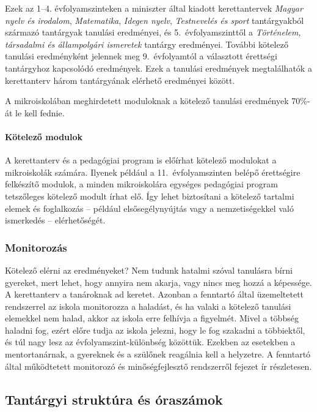 Ezek az 1--4. évfolyamszinteken a miniszter által kiadott kerettantervek \emph{Magyar nyelv és irodalom}, \emph{Matematika}, \emph{Idegen nyelv}, \emph{Testnevelés és sport} tantárgyakból származó tantárgyak tanulási eredményei, és 5.~évfolyamszinttől a \emph{Történelem, társadalmi és állampolgári ismeretek} tantárgy eredményei. További kötelező tanulási eredményként jelennek meg 9.~évfolyamtól a választott érettségi tantárgyhoz kapcsolódó eredmények. Ezek a tanulási eredmények megtalálhatók a kerettanterv három tantárgyának elérhető eredményei között.

A mikroiskolában meghirdetett moduloknak a kötelező tanulási eredmények 70\%-át le kell fednie.

\paragraph{Kötelező modulok}
A kerettanterv és a pedagógiai program is előírhat kötelező modulokat a mikroiskolák számára. Ilyenek például a 11.~évfolyamszinten belépő érettségire felkészítő modulok, a minden mikroiskolára egységes pedagógiai program tetszőleges kötelező modult írhat elő. Így lehet biztosítani a kötelező tartalmi elemek és foglalkozás -- például elsősegélynyújtás vagy a nemzetiségekkel való ismerkedés -- elérhetőségét.

\subsubsection{Monitorozás}

Kötelező elérni az eredményeket? Nem tudunk hatalmi szóval tanulásra bírni gyereket, mert lehet, hogy annyira nem akarja, vagy nincs meg hozzá a képessége. A kerettanterv a tanároknak ad keretet. Azonban a fenntartó által üzemeltetett rendszerrel az iskola  monitorozza a haladást, és ha valaki a kötelező tanulási elemekkel nem halad, akkor az iskola erre felhívja a figyelmét. Mivel a többség haladni fog, ezért előre tudja az iskola jelezni, hogy le fog szakadni a többiektől, és túl nagy lesz az évfolyamszint-különbség közöttük. Ezekben az esetekben a mentortanárnak, a gyereknek és a szülőnek reagálnia kell a helyzetre. A fenntartó által működtetett monitorozó és minőségfejlesztő rendszerről  fejezet ír részletesen.


\subsection{Tantárgyi struktúra és óraszámok}
\label{sec:tantargyi_struktura}
